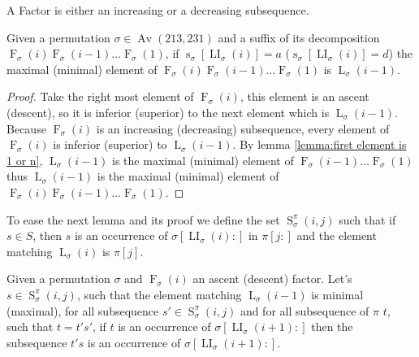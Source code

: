 \documentclass[a4paper]{llncs}
\DeclareMathOperator{\AV}{Av}
\newcommand{\ptext}{\pi}
\newcommand{\pmotif}{\sigma}
\DeclareMathOperator{\stripea}{s}
\newcommand{\stripe}[2]{\stripea_{{#1}}[{#2}]}
\newcommand{\dstep}{d}
\newcommand{\ustep}{a}
\DeclareMathOperator{\firsta}{L}
\newcommand{\first}[2]{\firsta_{{#1}}({#2})}
\DeclareMathOperator{\firstia}{LI}
\newcommand{\firsti}[2]{\firstia_{{#1}}({#2})}
\DeclareMathOperator{\factora}{F}
\newcommand{\factor}[2]{\factora_{{#1}}({#2})}
\DeclareMathOperator{\SETa}{S}
\newcommand{\SET}[4]{\SETa_{{#1}}^{{#2}}({#3},{#4})}
\begin{document}
\begin{remark}
A Factor is either an increasing or a decreasing subsequence.
\end{remark}

\begin{lemma}
\label{lemma:whereIsMax}
Given a permutation $\sigma \in \AV(213,231)$ and a suffix of its decomposition $\factor{\sigma}{i}\factor{\sigma}{i-1}\ldots\factor{\sigma}{1}$, if
$\stripe{\sigma}{\firsti{\sigma}{i}}=\ustep$ ($\stripe{\sigma}{\firsti{\sigma}{i}}=\dstep$)  the maximal (minimal) element of $\factor{\sigma}{i}\factor{\sigma}{i-1}\ldots\factor{\sigma}{1}$ is $\first{\sigma}{i-1}$.
\end{lemma}

\begin{proof}
Take the right most element of $\factor{\sigma}{i}$, this element is an ascent (descent),
so it is inferior (superior) to the next element which is $\first{\sigma}{i-1}$. Because $\factor{\sigma}{i}$ is an increasing (decreasing) subsequence, every element of $\factor{\sigma}{i}$ is inferior (superior) to $\first{\sigma}{i-1}$.
By lemma \ref{lemma:first element is 1 or n}, $\first{\sigma}{i-1}$ is the maximal (minimal) element of $\factor{\sigma}{i-1}\ldots\factor{\sigma}{1}$ thus $\first{\sigma}{i-1}$ is the maximal (minimal) element of $\factor{\sigma}{i}\factor{\sigma}{i-1}\ldots\factor{\sigma}{1}$.

\end{proof}

To ease the next lemma and its proof we define the set $\SET{\pmotif}{\ptext}{i}{j}$ such that if $s \in S$, then $s$ is an occurrence of $\pmotif[\firsti{\pmotif}{i}:]$ in $\ptext[j:]$ and the element matching $\first{\pmotif}{i}$ is $\ptext[j]$.

\begin{lemma}
Given a permutation $\pmotif$ and $\factor{\pmotif}{i}$ an ascent (descent) factor.
Let's $s \in \SET{\pmotif}{\ptext}{i}{j}$, such that the element matching $\first{\pmotif}{i-1}$ is minimal (maximal), for all subsequence 
$s' \in \SET{\pmotif}{\ptext}{i}{j}$ and for all subsequence of $\ptext$ $t$, such that $t=t's'$, if $t$ is an occurrence of $\pmotif[\firsti{\pmotif}{i+1}:]$ then the subsequence $t's$ is an occurrence of $\pmotif[\firsti{\pmotif}{i+1}:]$.
\end{lemma}
\end{document}
